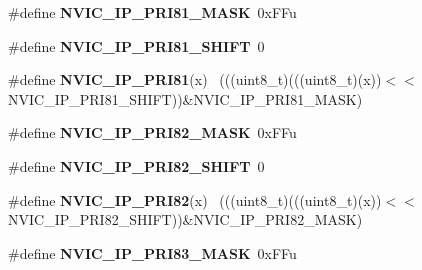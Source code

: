 \begin{DoxyCompactItemize}
\item 
\hypertarget{group___n_v_i_c___register___masks_gab22191bc454ca50eb592719a8108db66}{}\#define {\bfseries N\+V\+I\+C\+\_\+\+I\+P\+\_\+\+P\+R\+I81\+\_\+\+M\+A\+S\+K}~0x\+F\+Fu\label{group___n_v_i_c___register___masks_gab22191bc454ca50eb592719a8108db66}

\item 
\hypertarget{group___n_v_i_c___register___masks_ga3f02cd8bb46f32558ab1e31b03027156}{}\#define {\bfseries N\+V\+I\+C\+\_\+\+I\+P\+\_\+\+P\+R\+I81\+\_\+\+S\+H\+I\+F\+T}~0\label{group___n_v_i_c___register___masks_ga3f02cd8bb46f32558ab1e31b03027156}

\item 
\hypertarget{group___n_v_i_c___register___masks_ga7620e8d2a6292e3b3e166c670ccfe527}{}\#define {\bfseries N\+V\+I\+C\+\_\+\+I\+P\+\_\+\+P\+R\+I81}(x)                                              ~(((uint8\+\_\+t)(((uint8\+\_\+t)(x))$<$$<$N\+V\+I\+C\+\_\+\+I\+P\+\_\+\+P\+R\+I81\+\_\+\+S\+H\+I\+F\+T))\&N\+V\+I\+C\+\_\+\+I\+P\+\_\+\+P\+R\+I81\+\_\+\+M\+A\+S\+K)\label{group___n_v_i_c___register___masks_ga7620e8d2a6292e3b3e166c670ccfe527}

\item 
\hypertarget{group___n_v_i_c___register___masks_gab2120d92ac76d3e110dd547e28dd09d2}{}\#define {\bfseries N\+V\+I\+C\+\_\+\+I\+P\+\_\+\+P\+R\+I82\+\_\+\+M\+A\+S\+K}~0x\+F\+Fu\label{group___n_v_i_c___register___masks_gab2120d92ac76d3e110dd547e28dd09d2}

\item 
\hypertarget{group___n_v_i_c___register___masks_ga92362711a60b4c5321a276a60ef899ce}{}\#define {\bfseries N\+V\+I\+C\+\_\+\+I\+P\+\_\+\+P\+R\+I82\+\_\+\+S\+H\+I\+F\+T}~0\label{group___n_v_i_c___register___masks_ga92362711a60b4c5321a276a60ef899ce}

\item 
\hypertarget{group___n_v_i_c___register___masks_ga665b26014ac01e35d2a2e59e6f88aad9}{}\#define {\bfseries N\+V\+I\+C\+\_\+\+I\+P\+\_\+\+P\+R\+I82}(x)                                              ~(((uint8\+\_\+t)(((uint8\+\_\+t)(x))$<$$<$N\+V\+I\+C\+\_\+\+I\+P\+\_\+\+P\+R\+I82\+\_\+\+S\+H\+I\+F\+T))\&N\+V\+I\+C\+\_\+\+I\+P\+\_\+\+P\+R\+I82\+\_\+\+M\+A\+S\+K)\label{group___n_v_i_c___register___masks_ga665b26014ac01e35d2a2e59e6f88aad9}

\item 
\hypertarget{group___n_v_i_c___register___masks_ga2c9f19bf12d75fe53b10070a17a96878}{}\#define {\bfseries N\+V\+I\+C\+\_\+\+I\+P\+\_\+\+P\+R\+I83\+\_\+\+M\+A\+S\+K}~0x\+F\+Fu\label{group___n_v_i_c___register___masks_ga2c9f19bf12d75fe53b10070a17a96878}


\end{DoxyCompactItemize}
